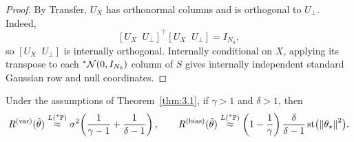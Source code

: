 \begin{proof}
By Transfer, $U_X$ has orthonormal columns and is orthogonal to $U_\perp$. Indeed,
\begin{equation}\label{eq:3.38}
[U_X \;\; U_\perp]^\top [U_X \;\; U_\perp] = I_{N_0},
\end{equation}
so $[U_X \;\; U_\perp]$ is internally orthogonal. Internally conditional on $X$, applying its transpose to each ${}^*\mathcal{N}(0, I_{N_0})$ column of $S$ gives internally independent standard Gaussian row and null coordinates.
\end{proof}

\begin{proposition}\label{prop:3.8}
Under the assumptions of Theorem~\ref{thm:3.1}, if $\gamma > 1$ and $\delta > 1$, then
\begin{equation}\label{eq:3.39}
R^{(\mathrm{var})}(\hat{\theta}) \stackrel{L({}^*\mathbb{P})}{\approx} \sigma^2\!\left(\frac{1}{\gamma - 1} + \frac{1}{\delta - 1}\right), \qquad R^{(\mathrm{bias})}(\hat{\theta}) \stackrel{L({}^*\mathbb{P})}{\approx} \left(1 - \frac{1}{\gamma}\right)\frac{\delta}{\delta - 1} \operatorname{st}\bigl(\left\lVert \theta_\star \right\rVert^2\bigr).
\end{equation}
\end{proposition}

